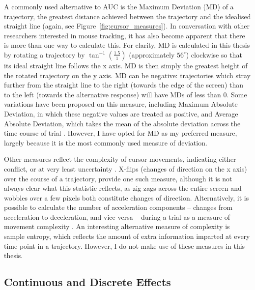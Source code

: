 A commonly used alternative to AUC is
the Maximum Deviation (MD) of a trajectory,
the greatest distance achieved between the trajectory
and the idealised straight line (again, see Figure~\ref{fig:cursor_measures}).
In conversation with other researchers interested in mouse tracking,
it has also become apparent that 
there is more than one way to calculate this.
For clarity, MD is calculated in this thesis
by rotating a trajectory by $\tan^{-1}( \frac{1.5}{1} )$
(approximately $56^{\circ}$) clockwise 
so that its ideal straight line follows the x axis.
MD is then simply the greatest height of 
the rotated trajectory on the y axis.
MD can be negative:
trajectories which stray further from the straight line to the right
(towards the edge of the screen)
than to the left (towards the alternative response)
will have MDs of less than 0.
Some variations have been proposed on this measure,
including Maximum Absolute Deviation,
in which these negative values are treated as positive,
and Average Absolute Deviation,
which takes the mean of the absolute deviation
across the time course of trial \citep{Koop2013}.
However, I have opted for MD as my preferred measure,
largely because it is the most commonly used measure of deviation.


Other measures reflect the complexity of cursor movements,
indicating either conflict, or at very least uncertainty
\citep{Wojnowicz2009, Dale2011}.
X-flips (changes of direction on the x axis)
over the course of a trajectory, provide one such measure,
although it is not always clear what this statistic reflects,
as zig-zags across the entire screen
and wobbles over a few pixels
both constitute changes of direction.
Alternatively, it is possible to calculate the number of
acceleration components -- 
changes from acceleration to deceleration, and vice versa --
during a trial as a measure of movement complexity
\citep{Dale2011}.
An interesting alternative measure of complexity 
is sample entropy, \citep{Richman2000, Dale2007}
which reflects the amount of extra information
imparted at every time point in a trajectory.
However, I do not make use of these measures in this thesis.


\subsection{Continuous and Discrete Effects} \label{sec:mousetracking-continuous}

